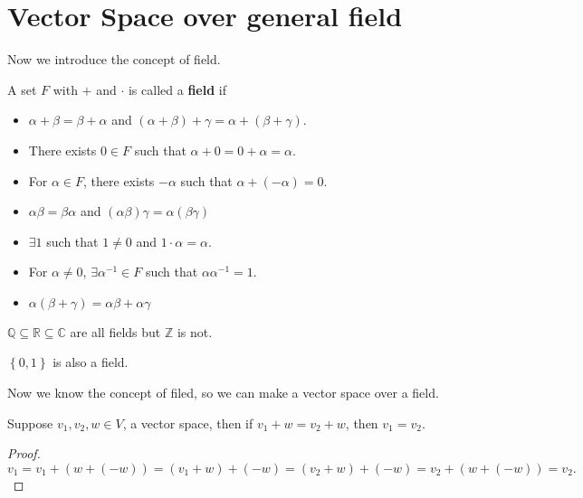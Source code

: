 \section{Vector Space over general field}
Now we introduce the concept of field. 
\begin{definition}[Field]\label{def: field}
    A set \(F\) with \(+\) and \(\cdot\) is called a \textbf{field} if 
    \begin{itemize}
        \item \(\alpha + \beta = \beta + \alpha \) and \((\alpha + \beta ) + \gamma = \alpha + (\beta + \gamma )\). 
        \item There exists \(0 \in F\) such that \(\alpha + 0 = 0 + \alpha = \alpha \). 
        \item For \(\alpha \in F\), there exists \(-\alpha \) such that \(\alpha + (-\alpha ) = 0\).
        \item \(\alpha \beta = \beta \alpha \) and \((\alpha \beta ) \gamma = \alpha (\beta \gamma )\)
        \item \(\exists 1\) such that \(1 \neq 0\) and \(1 \cdot \alpha = \alpha \). 
        \item For \(\alpha \neq 0\), \(\exists \alpha ^{-1} \in F\) such that \(\alpha \alpha ^{-1} = 1\).  
        \item \(\alpha (\beta + \gamma ) = \alpha \beta + \alpha \gamma \)             
    \end{itemize}  
\end{definition}

\begin{eg}
     \(\mathbb{Q}  \subseteq \mathbb{R} \subseteq \mathbb{C} \) are all fields but \(\mathbb{Z} \) is not. 
\end{eg}

\begin{eg}
    \(\left\{ 0,1 \right\} \) is also a field. 
\end{eg}

Now we know the concept of filed, so we can make a vector space over a field.

\begin{theorem} \label{thm: Cancellation Law}
Suppose \(v_1, v_2, w \in V\), a vector space, then if \(v_1 + w = v_2 + w\), then \(v_1 = v_2\).  
\end{theorem}
\begin{proof}
    \[
        v_1 = v_1 + (w + (-w)) = (v_1 + w) + (-w) = (v_2 + w) + (-w) = v_2 + (w + (-w)) = v_2.
    \]
\end{proof}


